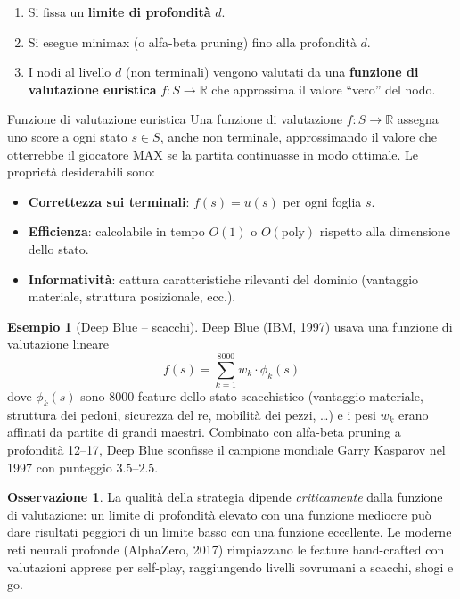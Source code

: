 \documentclass[12pt,a4paper,twoside]{book}
\theoremstyle{plain}
\theoremstyle{definition}
\newtheorem{example}[theorem]{Esempio}
\newtheorem{remark}[theorem]{Osservazione}
\begin{document}
\begin{enumerate}
  \item Si fissa un \textbf{limite di profondità} $d$.
  \item Si esegue minimax (o alfa-beta pruning) fino alla profondità $d$.
  \item I nodi al livello $d$ (non terminali) vengono valutati da una \textbf{funzione di valutazione euristica} $f: S \to \mathbb{R}$ che approssima il valore ``vero'' del nodo.
\end{enumerate}

\begin{defbox}{Funzione di valutazione euristica}
Una funzione di valutazione $f: S \to \mathbb{R}$ assegna uno score a ogni stato $s\in S$, anche non terminale, approssimando il valore che otterrebbe il giocatore MAX se la partita continuasse in modo ottimale. Le proprietà desiderabili sono:
\begin{itemize}
  \item \textbf{Correttezza sui terminali}: $f(s)=u(s)$ per ogni foglia $s$.
  \item \textbf{Efficienza}: calcolabile in tempo $O(1)$ o $O(\text{poly})$ rispetto alla dimensione dello stato.
  \item \textbf{Informativit\`a}: cattura caratteristiche rilevanti del dominio (vantaggio materiale, struttura posizionale, ecc.).
\end{itemize}
\end{defbox}

\begin{example}[Deep Blue -- scacchi]
Deep Blue (IBM, 1997) usava una funzione di valutazione lineare
\[
  f(s) = \sum_{k=1}^{8000} w_k \cdot \phi_k(s)
\]
dove $\phi_k(s)$ sono $8000$ feature dello stato scacchistico (vantaggio materiale, struttura dei pedoni, sicurezza del re, mobilità dei pezzi, \ldots) e i pesi $w_k$ erano affinati da partite di grandi maestri. Combinato con alfa-beta pruning a profondità 12--17, Deep Blue sconfisse il campione mondiale Garry Kasparov nel 1997 con punteggio $3.5$--$2.5$.
\end{example}

\begin{remark}
La qualità della strategia dipende \emph{criticamente} dalla funzione di valutazione: un limite di profondità elevato con una funzione mediocre può dare risultati peggiori di un limite basso con una funzione eccellente. Le moderne reti neurali profonde (AlphaZero, 2017) rimpiazzano le feature hand-crafted con valutazioni apprese per self-play, raggiungendo livelli sovrumani a scacchi, shogi e go.
\end{remark}
\end{document}

